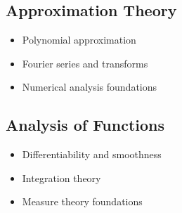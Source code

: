 \documentclass[11pt]{article}
\theoremstyle{definition}
\begin{document}
\subsection{Approximation Theory}
\begin{itemize}
    \item Polynomial approximation
    \item Fourier series and transforms
    \item Numerical analysis foundations
\end{itemize}

\subsection{Analysis of Functions}
\begin{itemize}
    \item Differentiability and smoothness
    \item Integration theory
    \item Measure theory foundations
\end{itemize}
\end{document}
